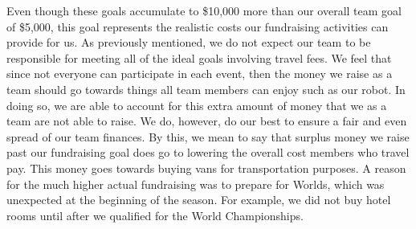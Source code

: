 Even though these goals accumulate to \$10,000 more than our overall team goal of \$5,000, this goal represents the realistic costs our fundraising activities can provide for us. As previously mentioned, we do not expect our team to be responsible for meeting all of the ideal goals involving travel fees. We feel that since not everyone can participate in each event, then the money we raise as a team should go towards things all team members can enjoy such as our robot. In doing so, we are able to account for this extra amount of money that we as a team are not able to raise. We do, however, do our best to ensure a fair and even spread of our team finances. By this, we mean to say that surplus money we raise past our fundraising goal does go to lowering the overall cost members who travel pay. This money goes towards buying vans for transportation purposes. A reason for the much higher actual fundraising was to prepare for Worlds, which was unexpected at the beginning of the season. For example, we did not buy hotel rooms until after we qualified for the World Championships. 


